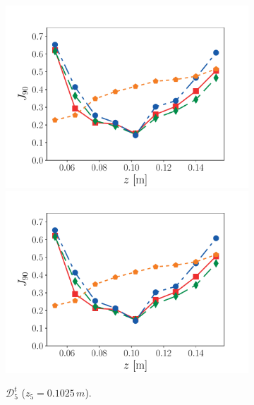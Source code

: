 \documentclass[review]{elsarticle}
\begin{document}
\begin{figure}[!tbp]
\begin{subfigure}[t]{0.32\textwidth}
    \includegraphics[page=1,width=\textwidth]{./figs/dice_predictions_0006.pdf}\\%
    \includegraphics[page=2,width=\textwidth]{./figs/dice_predictions_0006.pdf}%
    \caption{$\mathcal{D}_5^t$ ($z_5=0.1025\,\unit{m}$).}\label{fig:gen_5}%
  \end{subfigure}\hfill%
  \begin{subfigure}[t]{0.32\textwidth}%

\end{subfigure}
\end{figure}
\end{document}
